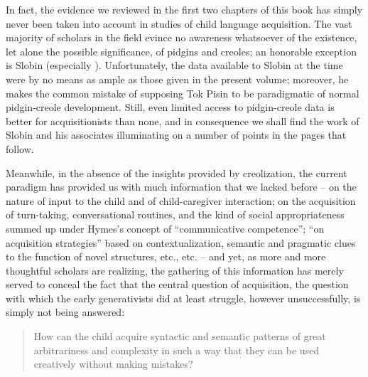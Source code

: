 In fact, the evidence we reviewed in the first two chapters of this book has simply never been taken into account in studies of child language acquisition. The vast majority of scholars in the field evince no awareness whatsoever of the existence, let alone the possible significance, of pidgins and creoles; an honorable exception is Slobin (especially \citealt{Slobin1977}). Unfortunately, the data available to Slobin at the time were by no means as ample as those given in the present volume; moreover, he makes the common mistake of supposing Tok Pisin to be paradigmatic of normal pidgin-creole development. Still, even limited access to pidgin-creole data is better for acquisitionists than none, and in consequence we shall find the work of Slobin and his associates illuminating on a number of points in the pages that follow.

Meanwhile, in the absence of the insights provided by creolization, the current paradigm has provided us with much information that we lacked before -- on the nature of input to the child and of child-caregiver interaction; on the acquisition of turn-taking, conversational routines, and the kind of social appropriateness summed up under Hymes's concept of ``communicative competence''; ``on acquisition strategies'' based on contextualization, semantic and pragmatic clues to the function of novel structures, etc., etc. -- and yet, as more and more thoughtful scholars are realizing, the gathering of this information has merely served to conceal the fact that the central question of acquisition, the question with which the early generativists did at least struggle, however unsuccessfully, is simply not being answered:

\begin{quote}
How can the child acquire syntactic and semantic patterns of great arbitrariness and complexity in such a way that they can be used creatively without making mistakes?
\end{quote}

